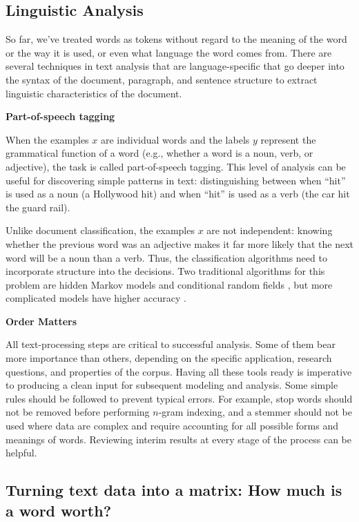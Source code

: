 \documentclass[]{krantz}
\begin{document}
\subsection{Linguistic Analysis}\label{linguistic-analysis}

So far, we've treated words as tokens without regard to the meaning of
the word or the way it is used, or even what language the word comes
from. There are several techniques in text analysis that are
language-specific that go deeper into the syntax of the document,
paragraph, and sentence structure to extract linguistic characteristics
of the document.

\textbf{Part-of-speech tagging}

When the examples \(x\) are individual words and the labels \(y\)
represent the grammatical function of a word (e.g., whether a word is a
noun, verb, or adjective), the task is called part-of-speech tagging.
This level of analysis can be useful for discovering simple patterns in
text: distinguishing between when ``hit'' is used as a noun (a Hollywood
hit) and when ``hit'' is used as a verb (the car hit the guard rail).

Unlike document classification, the examples \(x\) are not independent:
knowing whether the previous word was an adjective makes it far more
likely that the next word will be a noun than a verb. Thus, the
classification algorithms need to incorporate structure into the
decisions. Two traditional algorithms for this problem are hidden Markov
models \citep{rabiner-89} and conditional random fields
\citep{lafferty-01}, but more complicated models have higher accuracy
\citep{plank-16}.

\textbf{Order Matters}

All text-processing steps are critical to successful analysis. Some of
them bear more importance than others, depending on the specific
application, research questions, and properties of the corpus. Having
all these tools ready is imperative to producing a clean input for
subsequent modeling and analysis. Some simple rules should be followed
to prevent typical errors. For example, stop words should not be removed
before performing \(n\)-gram indexing, and a stemmer should not be used
where data are complex and require accounting for all possible forms and
meanings of words. Reviewing interim results at every stage of the
process can be helpful.

\subsection{Turning text data into a matrix: How much is a word
worth?}\label{turning-text-data-into-a-matrix-how-much-is-a-word-worth}
\end{document}
